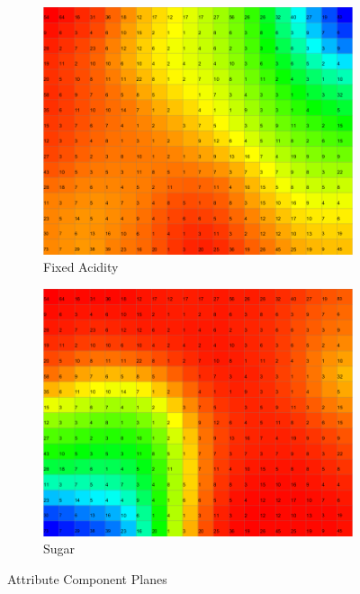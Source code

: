 \documentclass{acm_proc_article-sp}
\begin{document}
\begin{figure}
\begin{subfigure}[b]{0.48\linewidth}
    \end{subfigure}
    \begin{subfigure}[b]{0.48\linewidth}
        \includegraphics[width=\linewidth]{img/wine-newmid-thematic-component-plane-fixed-acidity}
        \caption{Fixed Acidity}
        \label{fig:wine-newmid-thematic-component-plane-fixed-acidity}
    \end{subfigure}
    \begin{subfigure}[b]{0.48\linewidth}
        \includegraphics[width=\linewidth]{img/wine-newmid-thematic-component-plane-sugar}
        \caption{Sugar}
        \label{fig:wine-newmid-thematic-component-plane-sugar}
    \end{subfigure}
    \caption{Attribute Component Planes}
\end{figure}
\end{document}
